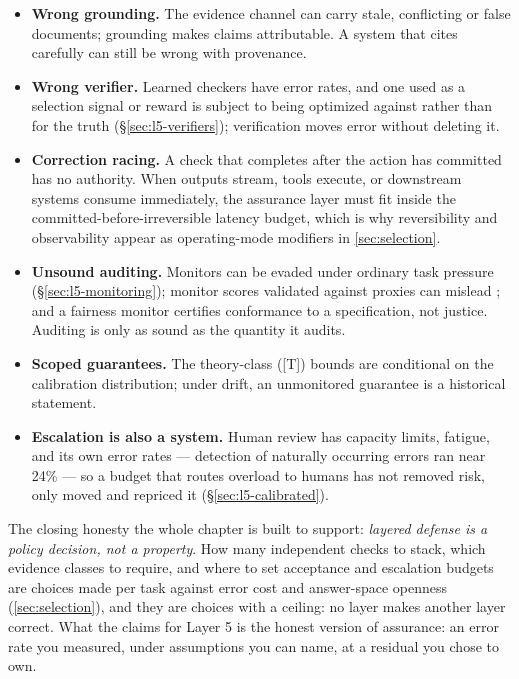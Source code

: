 \begin{itemize}
  \item \textbf{Wrong grounding.} The evidence channel can carry stale, conflicting or false
        documents; grounding makes claims attributable. A system that cites
        carefully can still be wrong with provenance.
  \item \textbf{Wrong verifier.} Learned checkers have error rates, and one used as a
        selection signal or reward is subject to being optimized against rather than for the
        truth (\S\ref{sec:l5-verifiers}); verification moves error without deleting it.
  \item \textbf{Correction racing.} A check that completes after the action has committed has
        no authority. When outputs stream, tools execute, or downstream systems consume
        immediately, the assurance layer must fit inside the committed-before-irreversible
        latency budget, which is why reversibility and observability appear as
        operating-mode modifiers in \cref{sec:selection}.
  \item \textbf{Unsound auditing.} Monitors can be evaded under ordinary task pressure
        (\S\ref{sec:l5-monitoring}); monitor scores validated against proxies can mislead
        \cite{id221116158}; and a fairness monitor certifies conformance to a
        specification, not justice. Auditing is only as sound as the quantity it audits.
  \item \textbf{Scoped guarantees.} The theory-class ([T]) bounds are conditional on the
        calibration distribution; under drift, an unmonitored guarantee is a historical
        statement.
  \item \textbf{Escalation is also a system.} Human review has capacity limits, fatigue, and
        its own error rates --- detection of naturally occurring errors ran near 24\%
        \cite{fang2026right} \evindep{} --- so a budget that routes overload to humans has not
        removed risk, only moved and repriced it (\S\ref{sec:l5-calibrated}).
\end{itemize}

The closing honesty the whole chapter is built to support: \emph{layered defense is a policy
decision, not a property}. How many independent checks to stack, which evidence classes to
require, and where to set acceptance and escalation budgets are choices made per task
against error cost and answer-space openness (\cref{sec:selection}), and they are choices with
a ceiling: no layer makes another layer correct. What the \reliabilitystack{} claims for Layer
5 is the honest version of assurance: an error rate you measured, under assumptions you can
name, at a residual you chose to own.
